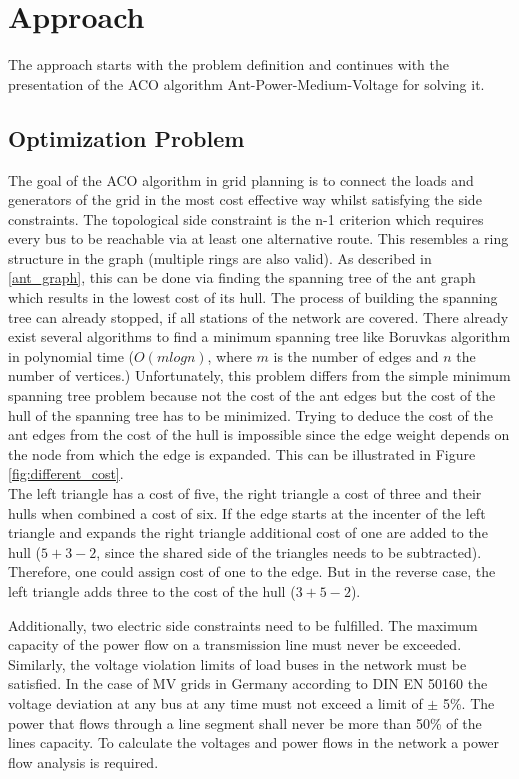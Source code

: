 \chapter{Approach}\label{chap:approach}
The approach starts with the problem definition and continues with the presentation of the ACO algorithm Ant-Power-Medium-Voltage for solving it.

\section{Optimization Problem}\label{optiproblem}
The goal of the ACO algorithm in grid planning is to connect the loads and generators of the grid in the most cost effective way whilst satisfying the side constraints. The topological side constraint is the n-1 criterion which requires every bus to be reachable via at least one alternative route. This resembles a ring structure in the graph (multiple rings are also valid). As described in \ref{ant_graph}, this can be done via finding the spanning tree of the ant graph which results in the lowest cost of its hull. The process of building the spanning tree can already stopped, if all stations of the network are covered. There already exist several algorithms to find a minimum spanning tree like Boruvkas algorithm in polynomial time ($O(mlogn)$, where $m$ is the number of edges and $n$ the number of vertices.) Unfortunately, this problem differs from the simple minimum spanning tree problem because not the cost of the ant edges but the cost of the hull of the spanning tree has to be minimized. Trying to deduce the cost of the ant edges from the cost of the hull is impossible since the edge weight depends on the node from which the edge is expanded. This can be illustrated in Figure \ref{fig:different_cost}.
 \\
The left triangle has a cost of five, the right triangle a cost of three and their hulls when combined a cost of six. If the edge starts at the incenter of the left triangle and expands the right triangle additional cost of one are added to the hull ($5+3-2$, since the shared side of the triangles needs to be subtracted). Therefore, one could assign cost of one to the edge. But in the reverse case, the left triangle adds three to the cost of the hull ($3+5-2$).

Additionally, two electric side constraints need to be fulfilled. The maximum capacity of the power flow on a transmission line must never be exceeded. Similarly, the voltage violation limits of load buses in the network must be satisfied. In the case of MV grids in Germany according to DIN EN 50160 the voltage deviation at any bus at any time must not exceed a limit of  $\pm$ 5\%. The power that flows through a line segment shall never be more than 50\% of the lines capacity. To calculate the voltages and power flows in the network a power flow analysis is required.

